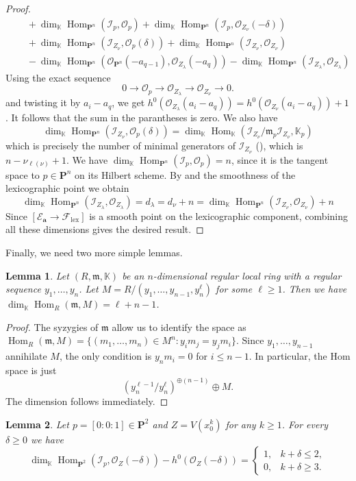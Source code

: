 \documentclass[leqno,11pt,a4paper]{amsart}
\newtheorem{lemma}[lemma]{Lemma}
\theoremstyle{definition}
\numberwithin{equation}{section}
\newcommand{\kk}{\mathbb{K}}
\newcommand{\bfa}{\mathbf{a}}
\newcommand{\lex}{\mathrm{lex}}
\newcommand{\PP}{\mathbf{P}}
\newcommand{\mfm}{\mathfrak{m}}
\newcommand{\EE}{\mathscr{E}}
\newcommand{\FF}{\mathscr{F}}
\newcommand{\OO}{\mathscr{O}}
\newcommand{\II}{\mathscr{I}}
\DeclareMathOperator{\Hom}{Hom}
\begin{document}
\begin{proof}
\begin{align*}
&\quad + \dim_\kk\Hom_{\PP^n}(\II_p,\OO_p)
+\dim_\kk\Hom_{\PP^n}(\II_p,\OO_{Z_\nu}(-\delta))\\
&\quad + \dim_\kk\Hom_{\PP^n}(\II_{Z_\nu},\OO_p(\delta))
+\dim_\kk\Hom_{\PP^n}(\II_{Z_\nu},\OO_{Z_\nu})
\\
&\quad-\dim_\kk\Hom_{\PP^n}(\OO_{\PP^n}(-a_{q-1}),\OO_{Z_\lambda}(-a_q))
-\dim_\kk\Hom_{\PP^n}(\II_{Z_\lambda},\OO_{Z_\lambda})
\end{align*}
Using the exact sequence
$$
0\longrightarrow\OO_p\longrightarrow \OO_{Z_\lambda}\longrightarrow\OO_{Z_\nu} \longrightarrow0.
$$
and twisting it by $a_i-a_q$, we get $ h^0(\OO_{Z_\lambda}(a_i-a_q)) = h^0(\OO_{Z_\nu}(a_i-a_q))+1$. 
It follows that the sum in the parantheses is zero. 
We also have 
$$
\dim_\kk\Hom_{\PP^n}(\II_{Z_\nu},\OO_p(\delta)) = \dim_\kk \Hom_\kk(\II_{Z_\nu}/\mfm_p\II_{Z_\nu}, \kk_p)
$$
which is precisely the number of minimal generators of $\II_{Z_\nu}$ (), which is $n- \nu_{\ell(\nu)}+1$.
We have $\dim_\kk \Hom_{\PP^n}(\II_p,\OO_p) = n$, since it is the tangent space to $p \in \PP^n$ on its Hilbert scheme.
By \cite[Theorem 4.1]{RS97} and the smoothness of the lexicographic point we obtain
$$
\dim_\kk\Hom_{\PP^n}(\II_{Z_\lambda},\OO_{Z_\lambda}) = d_\lambda = d_\nu+n 
= \dim_\kk\Hom_{\PP^n}(\II_{Z_\nu},\OO_{Z_\nu}) + n
$$
Since $[\EE_{\bfa} \to \FF_{\lex}]$ is a smooth point on the lexicographic component, combining all these dimensions gives the desired result.
\end{proof}

Finally, we need two more simple lemmas.

\begin{lemma} \label{hom_max}
Let $(R,\mfm,\kk)$ be an $n$-dimensional regular local ring with a regular sequence $y_1,\dots,y_n$. 
Let $M = R/(y_1,\dots,y_{n-1},y_n^\ell)$ for some $\ell \geq 1$. 
Then we have  $\dim_\kk \Hom_R(\mfm,M)=\ell+n-1$.
\end{lemma}
\begin{proof}
The syzygies of $\mfm$ allow us to identify the space as  $\Hom_R(\mfm,M) =\{(m_1,\ldots,m_n)\in M^n: y_im_j=y_jm_i\}$.
Since $y_1,\ldots,y_{n-1}$ annihilate $M$, the only condition is $y_nm_i = 0$ for $i \leq n-1$. 
In particular, the Hom space is just 
$$
(y_{n}^{\ell-1}/y_n^{\ell})^{\oplus(n-1)} \oplus M.
$$
The dimension follows immediately. 
\end{proof}


\begin{lemma}\label{hom_hypersurface}
Let $p=[0:0:1]\in\PP^2$ and $Z = V(x_0^k)$ for any $k\geq 1$.
For every $\delta \geq 0$ we have
$$
\dim_\kk \Hom_{\PP^2}(\II_p,\OO_{Z}(-\delta)) - h^0(\OO_{Z}(-\delta))
=
\begin{cases}
1, & k + \delta \leq 2,\\
0, & k + \delta \geq 3.
\end{cases}
$$
\end{lemma}
\end{document}
